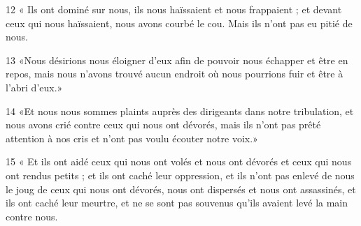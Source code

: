 \par 12 « Ils ont dominé sur nous, ils nous haïssaient et nous frappaient ; et devant ceux qui nous haïssaient, nous avons courbé le cou. Mais ils n'ont pas eu pitié de nous.
\par 13 «Nous désirions nous éloigner d'eux afin de pouvoir nous échapper et être en repos, mais nous n'avons trouvé aucun endroit où nous pourrions fuir et être à l'abri d'eux.»
\par 14 «Et nous nous sommes plaints auprès des dirigeants dans notre tribulation, et nous avons crié contre ceux qui nous ont dévorés, mais ils n'ont pas prêté attention à nos cris et n'ont pas voulu écouter notre voix.»
\par 15 « Et ils ont aidé ceux qui nous ont volés et nous ont dévorés et ceux qui nous ont rendus petits ; et ils ont caché leur oppression, et ils n'ont pas enlevé de nous le joug de ceux qui nous ont dévorés, nous ont dispersés et nous ont assassinés, et ils ont caché leur meurtre, et ne se sont pas souvenus qu'ils avaient levé la main contre nous.



